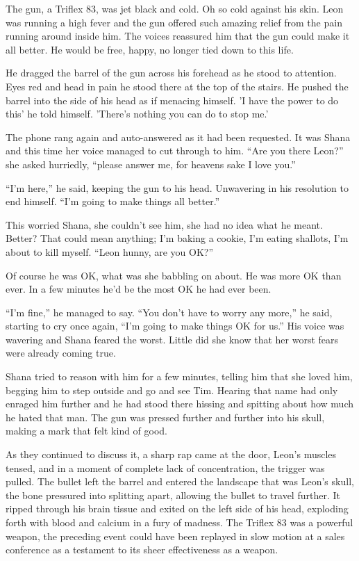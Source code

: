 The gun, a Triflex 83, was jet black and cold.  Oh so cold against his skin.  Leon was running a high fever and the gun offered such amazing relief from the pain running around inside him.  The voices reassured him that the gun could make it all better.  He would be free, happy, no longer tied down to this life.  

He dragged the barrel of the gun across his forehead as he stood to attention.  Eyes red and head in pain he stood there at the top of the stairs.  He pushed the barrel into the side of his head as if menacing himself.  'I have the power to do this' he told himself.  'There's nothing you can do to stop me.'

The phone rang again and auto-answered as it had been requested.  It was Shana and this time her voice managed to cut through to him.  ``Are you there Leon?'' she asked hurriedly, ``please answer me, for heavens sake I love you.''  

``I'm here,'' he said, keeping the gun to his head.  Unwavering in his resolution to end himself.  ``I'm going to make things all better.''

This worried Shana, she couldn't see him, she had no idea what he meant.  Better?  That could mean anything; I'm baking a cookie, I'm eating shallots, I'm about to kill myself.  ``Leon hunny, are you OK?''

Of course he was OK, what was she babbling on about.  He was more OK than ever.  In a few minutes he'd be the most OK he had ever been.  

``I'm fine,'' he managed to say.  ``You don't have to worry any more,'' he said, starting to cry once again, ``I'm going to make things OK for us.''  His voice was wavering and Shana feared the worst.  Little did she know that her worst fears were already coming true.  

Shana tried to reason with him for a few minutes, telling him that she loved him, begging him to step outside and go and see Tim.  Hearing that name had only enraged him further and he had stood there hissing and spitting about how much he hated that man.  The gun was pressed further and further into his skull, making a mark that felt kind of good.

As they continued to discuss it, a sharp rap came at the door, Leon's muscles tensed, and in a moment of complete lack of concentration, the trigger was pulled.  The bullet left the barrel and entered the landscape that was Leon's skull, the bone pressured into splitting apart, allowing the bullet to travel further.  It ripped through his brain tissue and exited on the left side of his head, exploding forth with blood and calcium in a fury of madness.  The Triflex 83 was a powerful weapon, the preceding event could have been replayed in slow motion at a sales conference as a testament to its sheer effectiveness as a weapon.


